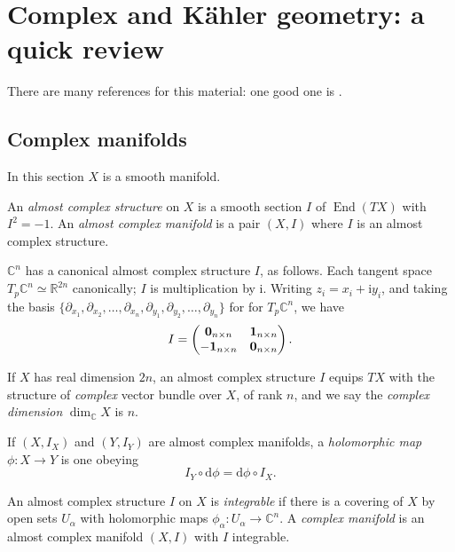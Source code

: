\documentclass[12pt,letterpaper,reqno]{amsart}
\numberwithin{equation}{section}
\newcommand{\R}{\ensuremath{\mathbb R}}
\newcommand{\C}{\ensuremath{\mathbb C}}
\newcommand{\kahler}{K\"ahler\xspace}
\newcommand{\I}{{\mathrm i}}
\newcommand{\de}{\mathrm{d}}
\newcommand{\ti}[1]{\textit{#1}}
\DeclareMathOperator{\End}{End}
\newcommand{\fixme}[1]{{\color{blue}{[#1]}}}
\begin{document}
\section{Complex and \kahler geometry: a quick review}

There are many references for this material: one
good one is \cite{MR2093043}.


\subsection{Complex manifolds} 
In this section $X$ is a smooth manifold.

\begin{defn}
An \ti{almost complex structure} on $X$ is a smooth section $I$ of $\End(TX)$ with $I^2 = -1$. An \ti{almost complex manifold} is a pair $(X,I)$ where $I$ is an almost complex structure.
\end{defn}

\begin{example} $\C^n$ has a canonical almost complex structure $I$, as follows. Each tangent space $T_p \C^n \simeq \R^{2n}$ canonically; $I$ is multiplication by $\I$.
Writing $z_i = x_i + \I y_i$, and taking the basis
$\{\partial_{x_1}, \partial_{x_2}, \dots, \partial_{x_n}, \partial_{y_1}, \partial_{y_2}, \dots, \partial_{y_n}\}$ for for $T_p \C^n$, we have \fixme{check sign}
\begin{equation}
   I = \begin{pmatrix} {\bf 0}_{n \times n} & {\bf 1}_{n \times n} \\ -{\bf 1}_{n \times n} & {\bf 0}_{n \times n} \end{pmatrix}.
\end{equation}
\end{example}

If $X$ has real dimension $2n$, an almost complex
structure $I$ equips $TX$ with the structure of
\ti{complex} vector bundle over $X$, of rank $n$,
and we say the \ti{complex dimension} $\dim_\C X$ is
$n$.

 \begin{defn} If $(X,I_X)$ and $(Y,I_Y)$ are almost
 complex manifolds, a \ti{holomorphic map} $\phi: X \to Y$
is one obeying
\begin{equation}
 I_Y \circ \de \phi = \de \phi \circ I_X.  
\end{equation}
\end{defn}

\begin{defn} An almost complex structure $I$ on $X$ is \ti{integrable} if there is a covering of $X$ by open sets $U_\alpha$ with holomorphic maps $\phi_\alpha: U_\alpha \to \C^n$. A \ti{complex manifold} is an almost complex manifold $(X,I)$ with $I$ integrable.
\end{defn}
\end{document}
